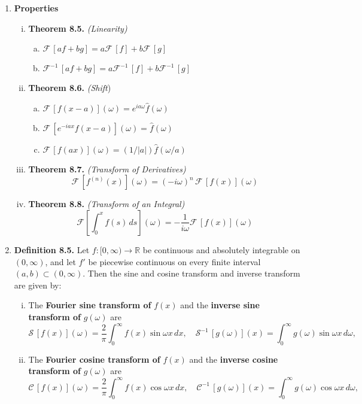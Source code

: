 \begin{enumerate}
\item \textbf{Properties}
\begin{enumerate}[(i)]
    \item \textbf{Theorem 8.5.} \textit{(Linearity) }
    \begin{enumerate}[(a)]
        \item $\mathcal{F}\,[af+bg] = a\mathcal{F}\,[f] + b \mathcal{F}\,[g]$
        \item $\mathcal{F}^{-1}\,[af+bg] = a\mathcal{F}^{-1}\,[f] + b \mathcal{F}^{-1}\,[g]$
    \end{enumerate}
    \item \textbf{Theorem 8.6.} \textit{(Shift}) 
    \begin{enumerate}[(a)]
        \item $\mathcal{F}\,[f(x-a)](\omega) = e^{ia\omega}\widehat{f}(\omega)$
        \item $\mathcal{F}\,[e^{-iax} f(x-a)](\omega) = \widehat{f}(\omega)$
        \item $\mathcal{F}\,[f(ax)](\omega) = (1/|a|)\widehat{f}(\omega/a)$
    \end{enumerate}
    \item \textbf{Theorem 8.7.} \textit{(Transform of Derivatives) }
    \[\mathcal{F}\,[f^{(n)}(x)] (\omega) = (-i\omega)^{n}\, \mathcal{F}\,[f(x)](\omega)\]
    \item \textbf{Theorem 8.8.} \textit{(Transform of an Integral)}
    \[\mathcal{F}\left[ \int_{0}^{x}f(s)\,ds \right] (\omega) = -\frac{1}{i\omega} \mathcal{F}\, [f(x)](\omega)\]
\end{enumerate}


% 
% 



\newpage


\item \textbf{Definition 8.5.} Let $f : [0, \infty) \to \mathbb{R}$ be continuous and absolutely integrable on $(0, \infty)$, and let $f '$ be piecewise continuous on every finite interval $(a, b) \subset
(0, \infty)$. Then the sine and cosine transform and inverse transform are given by:
\begin{enumerate}[(i)]
    \item The \textbf{Fourier sine transform of} $f (x)$ and the \textbf{inverse sine transform of} $g(\omega)$ are
    \[\mathcal{S}\,[f(x)](\omega)=\frac{2}{\pi} \int_{0}^{\infty}f(x)\sin\omega x \, dx, \quad \mathcal{S}^{-1}\,[g(\omega)](x)= \int_{0}^{\infty}g(\omega)\sin\omega x \, d\omega,\]
    \item The \textbf{Fourier cosine transform of} $f (x)$ and the \textbf{inverse cosine transform of} $g(\omega)$ are
    \[\mathcal{C}\,[f(x)](\omega)=\frac{2}{\pi} \int_{0}^{\infty}f(x)\cos\omega x \, dx, \quad \mathcal{C}^{-1}\,[g(\omega)](x)= \int_{0}^{\infty}g(\omega)\cos\omega x \, d\omega,\]
\end{enumerate}



\end{enumerate}
